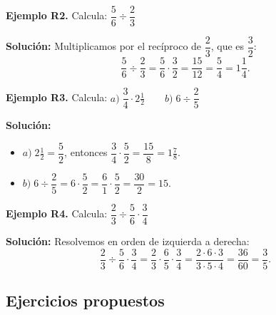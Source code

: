 \documentclass[12pt, letterpaper]{article}
\begin{document}
\textbf{Ejemplo R2.} Calcula: $\dfrac{5}{6} \div \dfrac{2}{3}$

\begin{cuadrosolucion}
  \textbf{Solución:} Multiplicamos por el recíproco de $\dfrac{2}{3}$, que es $\dfrac{3}{2}$:
  $$\frac{5}{6} \div \frac{2}{3} = \frac{5}{6} \cdot \frac{3}{2} = \frac{15}{12} = \frac{5}{4} = 1\frac{1}{4}.$$
\end{cuadrosolucion}

\textbf{Ejemplo R3.} Calcula: $a) \; \dfrac{3}{4} \cdot 2\frac{1}{2} \qquad b) \; 6 \div \dfrac{2}{5}$

\begin{cuadrosolucion}
  \textbf{Solución:}
  \begin{itemize}
    \item $a) \; 2\frac{1}{2} = \dfrac{5}{2}$, entonces $\dfrac{3}{4} \cdot \dfrac{5}{2} = \dfrac{15}{8} = 1\frac{7}{8}$.
    \item $b) \; 6 \div \dfrac{2}{5} = 6 \cdot \dfrac{5}{2} = \dfrac{6}{1} \cdot \dfrac{5}{2} = \dfrac{30}{2} = 15$.
  \end{itemize}
\end{cuadrosolucion}

\textbf{Ejemplo R4.} Calcula: $\dfrac{2}{3} \div \dfrac{5}{6} \cdot \dfrac{3}{4}$

\begin{cuadrosolucion}
  \textbf{Solución:} Resolvemos en orden de izquierda a derecha:
  $$\frac{2}{3} \div \frac{5}{6} \cdot \frac{3}{4} = \frac{2}{3} \cdot \frac{6}{5} \cdot \frac{3}{4} = \frac{2 \cdot 6 \cdot 3}{3 \cdot 5 \cdot 4} = \frac{36}{60} = \frac{3}{5}.$$
\end{cuadrosolucion}


\subsection{Ejercicios propuestos}
\end{document}
